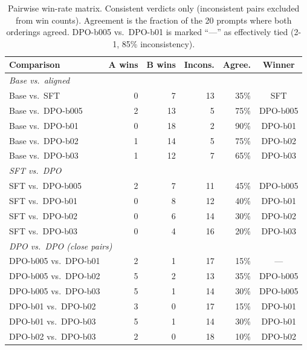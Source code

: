 \documentclass[../main.tex]{subfiles}
\begin{document}
\begin{table}[h]
\centering
\small
\begin{tabular}{lrrrrc}
\toprule
\textbf{Comparison} & \textbf{A wins} & \textbf{B wins} & \textbf{Incons.} & \textbf{Agree.} & \textbf{Winner} \\
\midrule
\multicolumn{6}{l}{\textit{Base vs.\ aligned}} \\
Base vs.\ SFT          & 0 & 7  & 13 & 35\% & SFT \\
Base vs.\ DPO-b005     & 2 & 13 &  5 & 75\% & DPO-b005 \\
Base vs.\ DPO-b01      & 0 & 18 &  2 & 90\% & DPO-b01 \\
Base vs.\ DPO-b02      & 1 & 14 &  5 & 75\% & DPO-b02 \\
Base vs.\ DPO-b03      & 1 & 12 &  7 & 65\% & DPO-b03 \\
\midrule
\multicolumn{6}{l}{\textit{SFT vs.\ DPO}} \\
SFT vs.\ DPO-b005      & 2 &  7 & 11 & 45\% & DPO-b005 \\
SFT vs.\ DPO-b01       & 0 &  8 & 12 & 40\% & DPO-b01 \\
SFT vs.\ DPO-b02       & 0 &  6 & 14 & 30\% & DPO-b02 \\
SFT vs.\ DPO-b03       & 0 &  4 & 16 & 20\% & DPO-b03 \\
\midrule
\multicolumn{6}{l}{\textit{DPO vs.\ DPO (close pairs)}} \\
DPO-b005 vs.\ DPO-b01  & 2 &  1 & 17 & 15\% & --- \\
DPO-b005 vs.\ DPO-b02  & 5 &  2 & 13 & 35\% & DPO-b005 \\
DPO-b005 vs.\ DPO-b03  & 5 &  1 & 14 & 30\% & DPO-b005 \\
DPO-b01 vs.\ DPO-b02   & 3 &  0 & 17 & 15\% & DPO-b01 \\
DPO-b01 vs.\ DPO-b03   & 5 &  1 & 14 & 30\% & DPO-b01 \\
DPO-b02 vs.\ DPO-b03   & 2 &  0 & 18 & 10\% & DPO-b02 \\
\bottomrule
\end{tabular}
\caption{Pairwise win-rate matrix. Consistent verdicts only (inconsistent pairs excluded from win counts). Agreement is the fraction of the 20 prompts where both orderings agreed. DPO-b005 vs.\ DPO-b01 is marked ``---'' as effectively tied (2-1, 85\% inconsistency).}
\label{tab:winrate}
\end{table}
\end{document}
